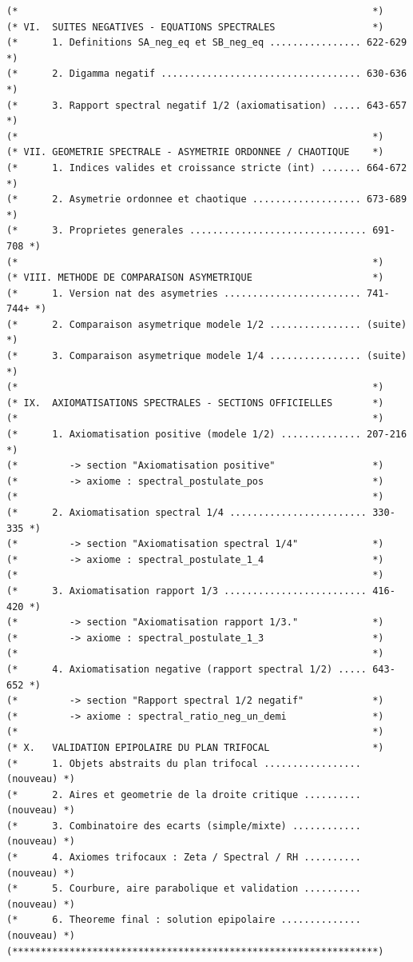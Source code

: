 \documentclass[a4paper,11pt]{article}
\begin{document}
\begin{holcode}[title={\textcolor{white}{Fichier : methode\_spectral.thy -- Partie 1/4}}]
\begin{lstlisting}
(*                                                              *)
(* VI.  SUITES NEGATIVES - EQUATIONS SPECTRALES                 *)
(*      1. Definitions SA_neg_eq et SB_neg_eq ................ 622-629 *)
(*      2. Digamma negatif ................................... 630-636 *)
(*      3. Rapport spectral negatif 1/2 (axiomatisation) ..... 643-657 *)
(*                                                              *)
(* VII. GEOMETRIE SPECTRALE - ASYMETRIE ORDONNEE / CHAOTIQUE    *)
(*      1. Indices valides et croissance stricte (int) ....... 664-672 *)
(*      2. Asymetrie ordonnee et chaotique ................... 673-689 *)
(*      3. Proprietes generales ............................... 691-708 *)
(*                                                              *)
(* VIII. METHODE DE COMPARAISON ASYMETRIQUE                     *)
(*      1. Version nat des asymetries ........................ 741-744+ *)
(*      2. Comparaison asymetrique modele 1/2 ................ (suite) *)
(*      3. Comparaison asymetrique modele 1/4 ................ (suite) *)
(*                                                              *)
(* IX.  AXIOMATISATIONS SPECTRALES - SECTIONS OFFICIELLES       *)
(*                                                              *)
(*      1. Axiomatisation positive (modele 1/2) .............. 207-216 *)
(*         -> section "Axiomatisation positive"                 *)
(*         -> axiome : spectral_postulate_pos                   *)
(*                                                              *)
(*      2. Axiomatisation spectral 1/4 ........................ 330-335 *)
(*         -> section "Axiomatisation spectral 1/4"             *)
(*         -> axiome : spectral_postulate_1_4                   *)
(*                                                              *)
(*      3. Axiomatisation rapport 1/3 ......................... 416-420 *)
(*         -> section "Axiomatisation rapport 1/3."             *)
(*         -> axiome : spectral_postulate_1_3                   *)
(*                                                              *)
(*      4. Axiomatisation negative (rapport spectral 1/2) ..... 643-652 *)
(*         -> section "Rapport spectral 1/2 negatif"            *)
(*         -> axiome : spectral_ratio_neg_un_demi               *)
(*                                                              *)
(* X.   VALIDATION EPIPOLAIRE DU PLAN TRIFOCAL                  *)
(*      1. Objets abstraits du plan trifocal ................. (nouveau) *)
(*      2. Aires et geometrie de la droite critique .......... (nouveau) *)
(*      3. Combinatoire des ecarts (simple/mixte) ............ (nouveau) *)
(*      4. Axiomes trifocaux : Zeta / Spectral / RH .......... (nouveau) *)
(*      5. Courbure, aire parabolique et validation .......... (nouveau) *)
(*      6. Theoreme final : solution epipolaire .............. (nouveau) *)
(****************************************************************)


\end{lstlisting}
\end{holcode}
\end{document}
